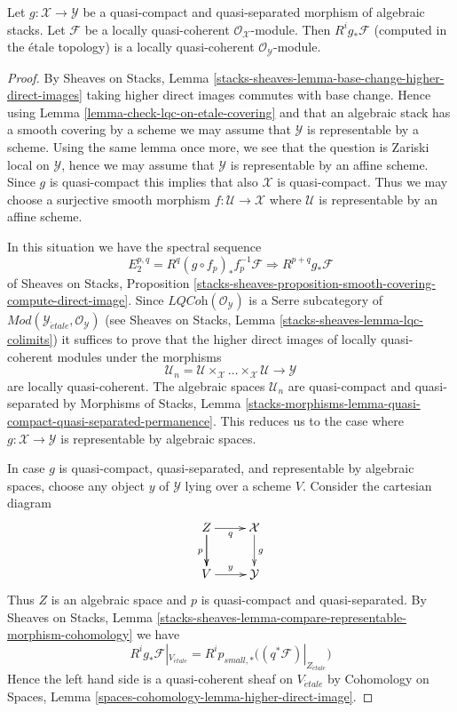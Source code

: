 \begin{lemma}
\label{lemma-pushforward-locally-quasi-coherent}
Let $g : \mathcal{X} \to \mathcal{Y}$ be a quasi-compact and
quasi-separated morphism of algebraic stacks. Let 
$\mathcal{F}$ be a locally quasi-coherent
$\mathcal{O}_\mathcal{X}$-module. Then $R^ig_*\mathcal{F}$
(computed in the \'etale topology) is
a locally quasi-coherent $\mathcal{O}_\mathcal{Y}$-module.
\end{lemma}

\begin{proof}
By
Sheaves on Stacks, Lemma
\ref{stacks-sheaves-lemma-base-change-higher-direct-images}
taking higher direct images commutes with base change.
Hence using
Lemma \ref{lemma-check-lqc-on-etale-covering}
and that an algebraic stack has a smooth covering by
a scheme we may assume that $\mathcal{Y}$ is representable by a scheme.
Using the same lemma once more, we see that
the question is Zariski local on $\mathcal{Y}$, hence we may assume that
$\mathcal{Y}$ is representable by an affine scheme. Since $g$ is
quasi-compact this implies that also $\mathcal{X}$ is quasi-compact.
Thus we may choose a surjective smooth morphism
$f : \mathcal{U} \to \mathcal{X}$ where $\mathcal{U}$ is representable
by an affine scheme.

\medskip\noindent
In this situation we have the spectral sequence
$$
E_2^{p, q} = R^q(g \circ f_p)_*f_p^{-1}\mathcal{F}
\Rightarrow
R^{p + q}g_*\mathcal{F}
$$
of
Sheaves on Stacks, Proposition
\ref{stacks-sheaves-proposition-smooth-covering-compute-direct-image}.
Since $\textit{LQCoh}(\mathcal{O}_\mathcal{Y})$ is a Serre subcategory
of
$\textit{Mod}(\mathcal{Y}_{\acute{e}tale}, \mathcal{O}_\mathcal{Y})$
(see
Sheaves on Stacks, Lemma \ref{stacks-sheaves-lemma-lqc-colimits})
it suffices to prove that the higher direct images of locally
quasi-coherent modules under the morphisms
$$
\mathcal{U}_n =
\mathcal{U} \times_\mathcal{X} \ldots \times_\mathcal{X} \mathcal{U}
\longrightarrow
\mathcal{Y}
$$
are locally quasi-coherent. The algebraic spaces $\mathcal{U}_n$
are quasi-compact and quasi-separated by
Morphisms of Stacks, Lemma
\ref{stacks-morphisms-lemma-quasi-compact-quasi-separated-permanence}.
This reduces us to the case where $g : \mathcal{X} \to \mathcal{Y}$
is representable by algebraic spaces.

\medskip\noindent
In case $g$ is quasi-compact, quasi-separated, and representable by algebraic
spaces, choose any object $y$ of $\mathcal{Y}$ lying over a scheme $V$.
Consider the cartesian diagram
$$
\xymatrix{
Z \ar[d] \ar[r]_q \ar[d]_p & \mathcal{X} \ar[d]^g \\
V \ar[r]^y & \mathcal{Y}
}
$$
Thus $Z$ is an algebraic space and $p$ is quasi-compact and quasi-separated.
By Sheaves on Stacks, Lemma
\ref{stacks-sheaves-lemma-compare-representable-morphism-cohomology}
we have
$$
R^ig_*\mathcal{F}|_{V_{\acute{e}tale}} =
R^ip_{small, *}\big((q^*\mathcal{F})|_{Z_{\acute{e}tale}}\big)
$$
Hence the left hand side is a quasi-coherent sheaf on $V_{\acute{e}tale}$
by Cohomology on Spaces, Lemma
\ref{spaces-cohomology-lemma-higher-direct-image}.
\end{proof}


